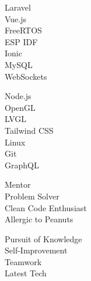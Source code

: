 \documentclass[9pt]{developercv} %
\begin{document}
\begin{minipage}[t]{0.3\textwidth}
	\vspace{-\baselineskip} %


        \vspace{0.2cm}

         \begin{minipage}[t]{0.4\textwidth}
        	\vspace{-\baselineskip} %
        	Laravel\\
        	Vue.js\\
                FreeRTOS\\
                ESP IDF\\
                Ionic\\
                MySQL\\
                WebSockets
        \end{minipage}
        \hfill
        \begin{minipage}[t]{0.4\textwidth}
        	\vspace{-\baselineskip} %

        	Node.js\\
        	OpenGL\\
                LVGL\\
        	Tailwind CSS\\
                Linux\\
                Git\\
                GraphQL
        \end{minipage}

\end{minipage}
\hfill
\begin{minipage}[t]{0.2\textwidth}
	\vspace{-\baselineskip} %
	

        Mentor\\
        Problem Solver\\
        Clean Code Enthusiast\\
        Allergic to Peanuts
\end{minipage}
\hfill
\begin{minipage}[t]{0.2\textwidth}
	\vspace{-\baselineskip} %
	

        Pursuit of Knowledge\\
        Self-Improvement\\
        Teamwork\\
        Latest Tech
\end{minipage}
\end{document}
